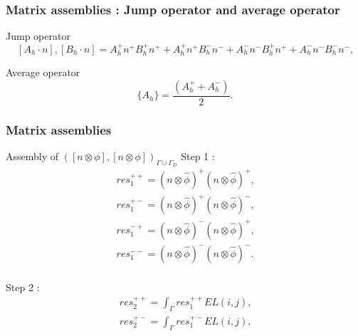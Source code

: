 \documentclass{beamer}
\begin{document}
\begin{frame}
\frametitle{Matrix assemblies : Jump operator and average operator}

\begin{block}{Jump operator}
\begin{equation} \label{Jump operator L2}
[A_h \cdot n],[B_h \cdot n] = A_h^+ n^+ B_h^+ n^+ + A_h^+ n^+ B_h^- n^- + A_h^- n^- B_h^+ n^+ + A_h^- n^- B_h^- n^- \textrm{,}
\end{equation}
\end{block}

\begin{block}{Average operator}
\begin{equation}\label{Average operator}
\lbrace A_h \rbrace = \frac{(A_h^+ + A_h^-)}{2} \textrm{.}
\end{equation}
\end{block}

\end{frame}
\begin{frame}
\frametitle{Matrix assemblies}
\begin{block}{Assembly of $([n \otimes \phi], [n \otimes \phi])_{\Gamma \cup \Gamma_D}$}
Step 1 :
\begin{equation}
\begin{split}
res_1^{++} = (n \otimes \hat{\phi})^+ (n \otimes \hat{\phi})^+ \textrm{,}\\
res_1^{+-} = (n \otimes \hat{\phi})^+ (n \otimes \hat{\phi})^- \textrm{,}\\
res_1^{-+} = (n \otimes \hat{\phi})^- (n \otimes \hat{\phi})^+ \textrm{,}\\
res_1^{--} = (n \otimes \hat{\phi})^- (n \otimes \hat{\phi})^- \textrm{.}\\
\end{split}
\end{equation}
 
Step 2 : 
\begin{equation}
\begin{split}
res_2^{++} = \int_{\Gamma} res_1^{++} EL(i,j) \textrm{,}\\
res_2^{+-} = \int_{\Gamma} res_1^{+-} EL(i,j) \textrm{,}\\
\end{split}
\end{equation}
\end{block}
\end{frame}
\end{document}
